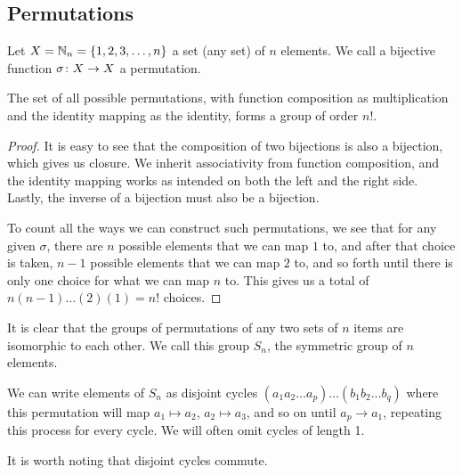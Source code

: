 \subsection{Permutations}

\begin{definition}
    Let \(X = \mathbb{N}_n = \{1,2,3,\hdots,n\}\)
    a set (any set) of \(n\) elements.
    We call a bijective function \(\sigma\colon X\to X\) a permutation.
\end{definition}
\begin{proposition}\label{prop:symmetric-group}
    The set of all possible permutations,
    with function composition as multiplication
    and the identity mapping as the identity,
    forms a group of order \(n!\).
\end{proposition}
\begin{proof}
    It is easy to see that the composition of two bijections
    is also a bijection,
    which gives us closure.
    We inherit associativity from function composition,
    and the identity mapping works as intended
    on both the left and the right side.
    Lastly, the inverse of a bijection
    must also be a bijection.

    To count all the ways we can construct such permutations,
    we see that for any given \(\sigma\),
    there are \(n\) possible elements that we can map \(1\) to,
    and after that choice is taken,
    \(n-1\) possible elements that we can map \(2\) to,
    and so forth until there is only one choice
    for what we can map \(n\) to.
    This gives us a total of \(n(n-1)\hdots(2)(1) = n!\) choices.
\end{proof}
\begin{definition}
    It is clear that the groups of permutations
    of any two sets of \(n\) items
    are isomorphic to each other.
    We call this group \(S_n\),
    the symmetric group of \(n\) elements.
\end{definition}

\begin{definition}
    We can write elements of \(S_n\) as disjoint cycles
    \((a_1 a_2 \hdots a_p) \hdots (b_1 b_2 \hdots b_q)\)
    where this permutation will map \(a_1 \mapsto a_2\),
    \(a_2 \mapsto a_3\), and so on until \(a_p \to a_1\),
    repeating this process for every cycle.
    We will often omit cycles of length 1.
\end{definition}
\begin{remark}
    It is worth noting that disjoint cycles commute.
\end{remark}

